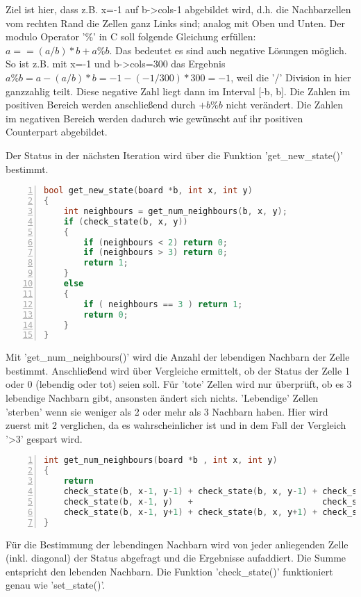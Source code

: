 \documentclass[plainarticle,zihtitle,german,final,hyperref,utf8]{zihpub}
\begin{document}
Ziel ist hier, dass z.B. x=-1 auf b->cols-1 abgebildet wird, d.h. die Nachbarzellen vom rechten Rand die Zellen ganz Links sind; analog mit Oben und Unten.
Der modulo Operator '\%' in C soll folgende Gleichung erfüllen: \begin{math}a == (a / b) * b + a \% b\end{math}. Das bedeutet es sind auch negative Lösungen möglich. So ist z.B. mit x=-1 und b->cols=300 das Ergebnis \newline\begin{math}a \% b = a - (a/b)*b = -1 - (-1/300) * 300 = -1\end{math},\newline 
weil die '/' Division in hier ganzzahlig teilt.
Diese negative Zahl liegt dann im Interval [-b, b]. Die Zahlen im positiven Bereich werden anschließend durch \begin{math}+b \% b\end{math} nicht verändert. Die Zahlen im negativen Bereich werden dadurch wie gewünscht auf ihr positiven Counterpart abgebildet. 

Der Status in der nächsten Iteration wird über die Funktion 'get\_new\_state()' bestimmt.
\begin{lstlisting}[language=c, numbers=left]
bool get_new_state(board *b, int x, int y)
{
	int neighbours = get_num_neighbours(b, x, y);
	if (check_state(b, x, y))
	{
		if (neighbours < 2) return 0;
		if (neighbours > 3) return 0;
		return 1;
	}
	else
	{
		if ( neighbours == 3 ) return 1;
		return 0;
	}
}
\end{lstlisting}\label{code:get_new_state}
Mit 'get\_num\_neighbours()' wird die Anzahl der lebendigen Nachbarn der Zelle bestimmt. Anschließend wird über Vergleiche ermittelt, ob der Status der Zelle 1 oder 0 (lebendig oder tot) seien soll.
Für 'tote' Zellen wird nur überprüft, ob es 3 lebendige Nachbarn gibt, ansonsten ändert sich nichts. 'Lebendige' Zellen 'sterben' wenn sie weniger als 2 oder mehr als 3 Nachbarn haben. Hier wird zuerst mit 2 verglichen, da es wahrscheinlicher ist und in dem Fall der Vergleich '>3' gespart wird.\newline

\begin{lstlisting}[language=c, numbers=left]
int get_num_neighbours(board *b , int x, int y)
{
	return
	check_state(b, x-1, y-1) + check_state(b, x, y-1) + check_state(b, x+1, y-1) +
	check_state(b, x-1, y)   +                          check_state(b, x+1, y) +
	check_state(b, x-1, y+1) + check_state(b, x, y+1) + check_state(b, x+1, y+1);
}
\end{lstlisting}
Für die Bestimmung der lebendingen Nachbarn wird von jeder anliegenden Zelle (inkl. diagonal) der Status abgefragt und die Ergebnisse aufaddiert. Die Summe entspricht den lebenden Nachbarn. Die Funktion 'check\_state()' funktioniert genau wie 'set\_state()'.
\end{document}
